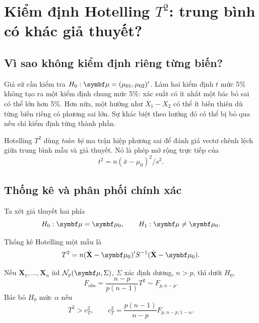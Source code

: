 \clearpage
\section{Kiểm định Hotelling \texorpdfstring{$T^2$}{T²}: trung bình có khác giả thuyết?}
\label{sec:hotelling}

\subsection{Vì sao không kiểm định riêng từng biến?}
Giả sử cần kiểm tra $H_0:\vmu=(\mu_{01},\mu_{02})'$. Làm hai kiểm định
$t$ mức 5\% không tạo ra một kiểm định chung mức 5\%: xác suất có ít nhất
một bác bỏ sai có thể lớn hơn 5\%. Hơn nữa, một hướng như $X_1-X_2$ có
thể ít biến thiên dù từng biến riêng có phương sai lớn. Sự khác biệt theo
hướng đó có thể bị bỏ qua nếu chỉ kiểm định từng thành phần.

Hotelling $T^2$ dùng \emph{toàn bộ} ma trận hiệp phương sai để đánh giá
vectơ chênh lệch giữa trung bình mẫu và giả thuyết. Nó là phép mở rộng
trực tiếp của
\[
 t^2=n(\bar x-\mu_0)^2/s^2.
\]

\subsection{Thống kê và phân phối chính xác}
Ta xét giả thuyết hai phía
\[
 H_0:\vmu=\vmu_0,\qquad H_1:\vmu\ne\vmu_0.
\]
\begin{definition}
Thống kê Hotelling một mẫu là
\begin{equation}
 T^2=n(\Xbar-\vmu_0)'S^{-1}(\Xbar-\vmu_0).
 \label{eq:t2}
\end{equation}
\end{definition}


\begin{result}
Nếu $\mathbf X_1,\ldots,\mathbf X_n$ iid $\N_p(\vmu,\Sigma)$,
$\Sigma$ xác định dương, $n>p$, thì dưới $H_0$,
\begin{equation}
 F_{\mathrm{obs}}=\frac{n-p}{p(n-1)}T^2\sim F_{p,n-p}.
 \label{eq:t2F}
\end{equation}
Bác bỏ $H_0$ mức $\alpha$ nếu
\begin{equation}
 T^2>c_T^2,\qquad
 c_T^2=\frac{p(n-1)}{n-p}F_{p,n-p;1-\alpha}.
 \label{eq:t2critical}
\end{equation}
\end{result}


